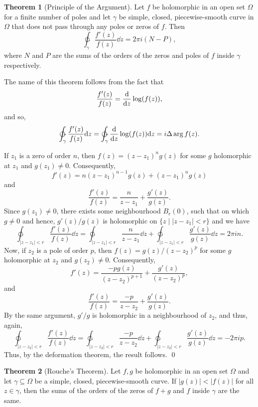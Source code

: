 \documentclass[
]{article}
\theoremstyle{definition}
\newtheorem{theorem}{Theorem}
\theoremstyle{definition}
\begin{document}
\begin{theorem}[Principle of the Argument]
  Let \(f\) be holomorphic in an open set \(\Omega\) for a finite number of poles 
  and let \(\gamma\) be simple, closed, piecewise-smooth curve in \(\Omega\) 
  that does not pass through any poles or zeros of \(f\). Then 
  \[\ointctrclockwise_\gamma \frac{f'(z)}{f(z)} \dd z = 2 \pi i (N - P),\]
  where \(N\) and \(P\) are the sums of the orders of the zeros and poles of 
  \(f\) inside \(\gamma\) respectively.
\end{theorem}

The name of this theorem follows from the fact that
\[\frac{f'(z)}{f(z)} = \dv{z} \log(f(z)),\] and so,
\[\ointctrclockwise_\gamma \frac{f'(z)}{f(z)} \dd z = 
  \ointctrclockwise_\gamma \dv{z} \log(f(z)) \dd z = i\Delta \arg f(z).\]

\proof

If \(z_1\) is a zero of order \(n\), then \(f(z) = (z - z_1)^n g(z)\)
for some \(g\) holomorphic at \(z_1\) and \(g(z_1) \neq 0\).
Consequently, \[f'(z) = n(z - z_1)^{n - 1}g(z) + (z - z_1)^n g(z)\] and
\[\frac{f'(z)}{f(z)} = \frac{n}{z - z_1} + \frac{g'(z)}{g(z)}.\] Since
\(g(z_1) \neq 0\), there exists some neighbourhood \(B_r(0)\), such that
on which \(g \neq 0\) and hence, \(g'(z) / g(z)\) is holomorphic on
\(\{z \mid |z - z_1| < r\}\) and we have
\[\ointctrclockwise_{|z -z_1| < r}\frac{f'(z)}{f(z)} \dd z 
    = \ointctrclockwise_{|z -z_1| < r}\frac{n}{z - z_1} \dd z + 
      \ointctrclockwise_{|z -z_1| < r}\frac{g'(z)}{g(z)} \dd z = 2\pi i n.\]
Now, if \(z_2\) is a pole of order \(p\), then
\(f(z) = g(z) / (z - z_2)^p\) for some \(g\) holomorphic at \(z_2\) and
\(g(z_2) \neq 0\). Consequently,
\[f'(z) = \frac{-pg(z)}{(z - z_2)^{p + 1}} + \frac{g'(z)}{(z - z_2)^p},\]
and \[\frac{f'(z)}{f(z)} = \frac{-p}{z - z_2} + \frac{g'(z)}{g(z)}.\] By
the same argument, \(g' / g\) is holomorphic in a neighbourhood of
\(z_2\), and thus, again,
\[\ointctrclockwise_{|z -z_2| < r}\frac{f'(z)}{f(z)} \dd z 
    = \ointctrclockwise_{|z -z_2| < r}\frac{-p}{z - z_2} \dd z + 
      \ointctrclockwise_{|z -z_2| < r}\frac{g'(z)}{g(z)} \dd z = - 2\pi i p.\]
Thus, by the deformation theorem, the result follows. \qed

\begin{theorem}[Rouche's Theorem]
  Let \(f, g\) be holomorphic in an open set \(\Omega\) and let \(\gamma \subseteq \Omega\) 
  be a simple, closed, piecewise-smooth curve. If \(|g(z)| < |f(z)|\) for all 
  \(z \in \gamma\), then the sums of the orders of the zeros of \(f + g\) and 
  \(f\) inside \(\gamma\) are the same.
\end{theorem}
\proof
\end{document}
